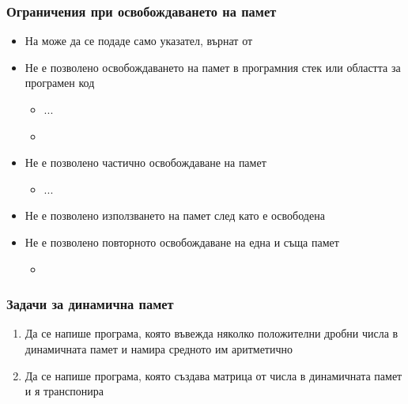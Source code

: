 \documentclass{beamer}
\begin{document}
\begin{frame}[fragile]
  \frametitle{Ограничения при освобождаването на памет}

  \begin{itemize}[<+->]
  \item На  може да се подаде само указател, върнат от 
  \item Не е позволено освобождаването на памет в програмния стек или областта за програмен код
    \begin{itemize}
    \item {} ... 
    \item {}
    \end{itemize}
  \item Не е позволено частично освобождаване на памет
    \begin{itemize}
    \item {} ... 
    \end{itemize}
  \item Не е позволено използването на памет след като е освободена
  \item Не е позволено повторното освобождаване на една и съща памет
    \begin{itemize}
    \item {} 
    \end{itemize}
  \end{itemize}
\end{frame}

\begin{frame}
  \frametitle{Задачи за динамична памет}

  \begin{enumerate}[<+->]
  \item Да се напише програма, която въвежда няколко положителни дробни числа в динамичната памет и намира средното им аритметично
  \item Да се напише програма, която създава матрица от числа в динамичната памет и я транспонира
  \end{enumerate}
\end{frame}
\end{document}
